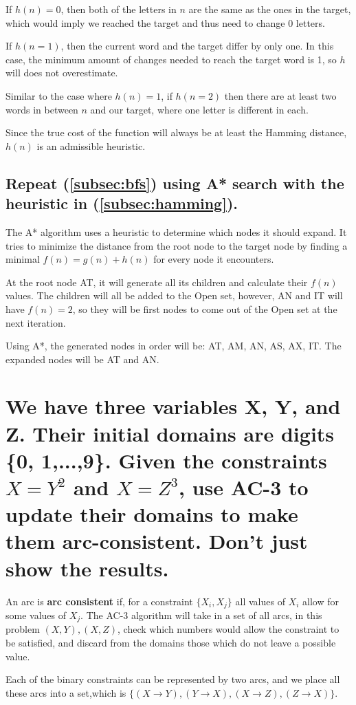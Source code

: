 \documentclass{article}
\begin{document}
		If $h(n) = 0$, then both of the letters in $n$ are the same as the ones in the target, which would 
		imply we reached the target and thus need to change 0 letters.
	
		If $h(n = 1)$, then the current word and the target differ by only one. In this case, the minimum amount
		of changes needed to reach the target word is 1, so $h$ will does not overestimate.

		Similar to the case where $h(n) = 1$, if $h(n = 2)$ then there are at least two words in between
		$n$ and our target, where one letter is different in each. 

		Since the true cost of the function will always be at least the Hamming distance, $h(n)$ is an 
		admissible heuristic.
	\subsection{Repeat (\ref{subsec:bfs}) using A* search with the heuristic in (\ref{subsec:hamming}).}
		The A* algorithm uses a heuristic to determine which nodes it should expand. It tries to minimize the 
		distance from the root node to the target node by finding a minimal $f(n) = g(n) + h(n)$ for every node
		it encounters. 

		At the root node AT, it will generate all its children and calculate their $f(n)$ values. The children
		will all be added to the Open set, however, AN and IT will have  $f(n) = 2$, so they will be first
		nodes to come out of the Open set at the next iteration. 

		Using A*, the generated nodes in order will be: AT, AM, AN, AS, AX, IT. The expanded nodes will be AT and 
		AN.
\section{ We have three variables X, Y, and Z. Their initial domains are digits \{0, 1,...,9\}. Given the
constraints $X = Y^{2}$ and $X=Z^{3}$, use AC-3 to update their domains to make them arc-consistent. Don't just
show the results.}

	An arc is \textbf{arc consistent} if, for a constraint $\{X_{i}, X_{j}\}$ all values of $X_{i}$ allow for
	some values of $X_{j}$. The AC-3 algorithm will take in a set of all arcs, in this problem 
	$(X, Y), (X, Z)$, check which numbers would allow the constraint to be satisfied, and discard from the 
	domains those which do not leave a possible value.

	Each of the binary constraints can be represented by two arcs, and we place all these arcs into a set,which is
	$\{(X\rightarrow Y),(Y\rightarrow X),(X\rightarrow Z),(Z\rightarrow X)\}$.
	
\end{document}
